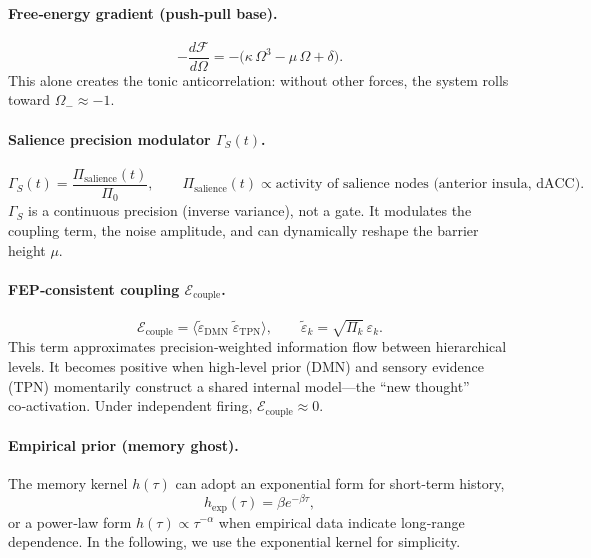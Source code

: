 \documentclass[11pt]{article}
\begin{document}
\paragraph{Free‑energy gradient (push‑pull base).}
\begin{equation}
-\frac{d\mathcal{F}}{d\Omega} = -\big(\kappa\,\Omega^3 - \mu\,\Omega + \delta\big).
\end{equation}
This alone creates the tonic anticorrelation: without other forces, the system rolls toward $\Omega_{-}\approx -1$.

\paragraph{Salience precision modulator $\Gamma_S(t)$.}
\begin{equation}
\Gamma_S(t) = \frac{\Pi_{\text{salience}}(t)}{\Pi_0},
\qquad \Pi_{\text{salience}}(t) \propto \text{activity of salience nodes (anterior insula, dACC)}.
\end{equation}
$\Gamma_S$ is a continuous precision (inverse variance), not a gate. It modulates the coupling term, the noise amplitude, and can dynamically reshape the barrier height $\mu$.

\paragraph{FEP‑consistent coupling $\mathcal{E}_{\text{couple}}$.}
\begin{equation}
\mathcal{E}_{\text{couple}} = \big\langle \tilde{\varepsilon}_{\text{DMN}}\;\tilde{\varepsilon}_{\text{TPN}} \big\rangle,
\qquad \tilde{\varepsilon}_k = \sqrt{\Pi_k}\,\varepsilon_k.
\end{equation}
This term approximates precision‐weighted information flow between hierarchical levels. It becomes positive when high‑level prior (DMN) and sensory evidence (TPN) momentarily construct a shared internal model—the “new thought” co‑activation. Under independent firing, $\mathcal{E}_{\text{couple}} \approx 0$.

\paragraph{Empirical prior (memory ghost).}
The memory kernel $h(\tau)$ can adopt an exponential form for short‑term history,
\begin{equation}
h_{\text{exp}}(\tau) = \beta e^{-\beta\tau},
\end{equation}
or a power‑law form $h(\tau) \propto \tau^{-\alpha}$ when empirical data indicate long‑range dependence. In the following, we use the exponential kernel for simplicity.
\end{document}
